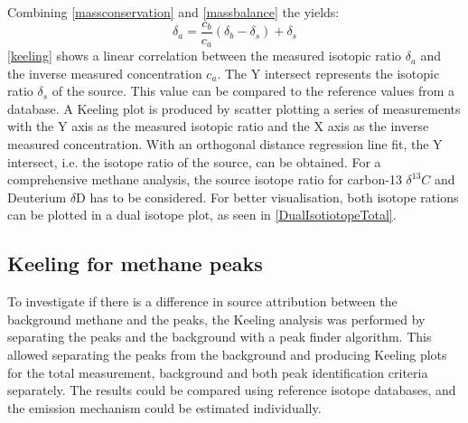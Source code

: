 Combining \cref{massconservation} and \cref{massbalance} the yields:
\begin{equation}\label{keeling}
\delta_a  = \frac{c_b}{c_a} (\delta_b  - \delta_s) + \delta_s
\end{equation}
\cref{keeling} shows a linear correlation between the measured isotopic ratio $\delta_a$ and the inverse measured concentration $c_a$. The Y intersect represents the isotopic ratio $\delta_s$ of the source. This value can be compared to the reference values from a database. A Keeling plot is produced by scatter plotting a series of measurements with the Y axis as the measured isotopic ratio and the X axis as the inverse measured concentration. With an orthogonal distance regression line fit, the Y intersect, i.e. the isotope ratio of the source, can be obtained. For a comprehensive methane analysis, the source isotope ratio for carbon-13 $\delta ^{13}C$ and Deuterium $\delta$D has to be considered. \cite{Liu.2019} For better visualisation, both isotope rations can be plotted in a dual isotope plot, as seen in \cref{DualIsotiotopeTotal}.

\subsection{Keeling for methane peaks}
To investigate if there is a difference in source attribution between the background methane and the peaks, the Keeling analysis was performed by separating the peaks and the background with a peak finder algorithm. This allowed separating the peaks from the background and producing Keeling plots for the total measurement, background and both peak identification criteria separately. The results could be compared using reference isotope databases, and the emission mechanism could be estimated individually.

